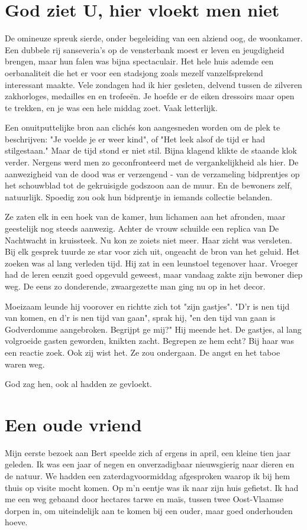 \documentclass[12pt, justified, a4paper, symmetric]{tufte-book}
\begin{document}
\section{God ziet U, hier vloekt men niet}
De omineuze spreuk sierde, onder begeleiding van een alziend oog, de woonkamer. Een dubbele rij sanseveria's op de vensterbank moest er leven en jeugdigheid brengen, maar hun falen was bijna spectaculair. Het hele huis ademde een oerbanaliteit die het er voor een stadsjong zoals mezelf vanzelfsprekend interessant maakte. Vele zondagen had ik hier gesleten, delvend tussen de zilveren zakhorloges, medailles en en trofee\"en. Je hoefde er de eiken dressoirs maar open te trekken, en je was een hele middag zoet. Vaak letterlijk.

Een onuitputtelijke bron aan clich\'es kon aangesneden worden om de plek te beschrijven: "Je voelde je er weer kind", of "Het leek alsof de tijd er had stilgestaan." Maar de tijd stond er niet stil. Bijna klagend klikte de staande klok verder. Nergens werd men zo geconfronteerd met de vergankelijkheid als hier. De aanwezigheid van de dood was er verzengend - van de verzameling bidprentjes op het schouwblad tot de gekruisigde godszoon aan de muur. En de bewoners zelf, natuurlijk. Spoedig zou ook hun bidprentje in iemands collectie belanden.

Ze zaten elk in een hoek van de kamer, hun lichamen aan het afronden, maar geestelijk nog steeds aanwezig. Achter de vrouw schuilde een replica van De Nachtwacht in kruissteek. Nu kon ze zoiets niet meer. Haar zicht was versleten. Bij elk gesprek tuurde ze star voor zich uit, ongeacht de bron van het geluid. Het zoeken was al lang verleden tijd. Hij zat in een leunstoel tegenover haar. Vroeger had de leren eenzit goed opgevuld geweest, maar vandaag zakte zijn bewoner diep weg. De eens zo donderende, zwaargezette man ging nu op in het decor.

Moeizaam leunde hij voorover en richtte zich tot "zijn gastjes". "D'r is nen tijd van komen, en d'r is nen tijd van gaan", sprak hij, "en den tijd van gaan is Godverdomme aangebroken. Begrijpt ge mij?" Hij meende het. De gastjes, al lang volgroeide gasten geworden, knikten zacht. Begrepen ze hem echt? Bij haar was een reactie zoek. Ook zij wist het. Ze zou ondergaan. De angst en het taboe waren weg.

God zag hen, ook al hadden ze gevloekt.

\newpage
\section{Een oude vriend}
Mijn eerste bezoek aan Bert speelde zich af ergens in april, een kleine tien jaar geleden. Ik was een jaar of negen en onverzadigbaar nieuwsgierig naar dieren en de natuur. We hadden een zaterdagvoormiddag afgesproken waarop ik bij hem thuis op visite mocht komen. Op m'n eentje was ik naar zijn huis gefietst. Ik had me een weg gebaand door hectares tarwe en ma\"is, tussen twee Oost-Vlaamse dorpen in, om uiteindelijk aan te komen bij een ouder, maar goed onderhouden hoeve.
\end{document}
